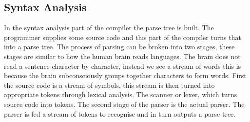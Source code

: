\subsection{Syntax Analysis}\label{sec:syntaxAnalysis}

In the syntax analysis part of the compiler the parse tree is built.
The programmer supplies some source code and this part of the compiler turns that into a parse tree.
The process of parsing can be broken into two stages, these stages are similar to how the human brain reads languages.
The brain does not read a sentence character by character, instead we see a stream of words this is because the brain subconsciously groups together characters to form words.
First the source code is a stream of symbols, this stream is then turned into appropriate tokens through lexical analysis.
The scanner or lexer, which turns source code into tokens.
The second stage of the parser is the actual parser.
The parser is fed a stream of tokens to recognise and in turn outputs a parse tree.

